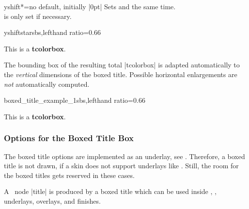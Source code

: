 \begin{boxTcbKey}{yshift*}{=}{no default, initially |0pt|}
Sets  and 
the same time.\\
 is only set if necessary.
\begin{exdispExample*}{yshiftstar}{sbs,lefthand ratio=0.66}
\begin{tcolorbox}[enhanced,title=My title,
  attach boxed title to top center={yshift*=-3mm},
  boxed title style={size=small,colback=blue}]
  This is a \textbf{tcolorbox}.
\end{tcolorbox}
\end{exdispExample*}
\end{boxTcbKey}

\begin{marker}
The bounding box of the resulting total |tcolorbox| is adapted automatically to the
\emph{vertical} dimensions of the boxed title. Possible horizontal enlargements
are \emph{not} automatically computed.
\end{marker}


\begin{exdispExample*}{boxed_title_example_1}{sbs,lefthand ratio=0.66}
\begin{tcolorbox}[enhanced,title=My title,
  attach boxed title to top left=
    {xshift=-2mm,yshift=-2mm},
  boxed title style={size=small,colback=blue},
  show bounding box]
  This is a \textbf{tcolorbox}.
\end{tcolorbox}
\end{exdispExample*}


\clearpage
\subsubsection{Options for the Boxed Title Box}
\begin{marker}
  The boxed title options are implemented as an underlay, see .
  Therefore, a boxed title is not drawn, if a skin does not support underlays
  like . Still, the room for the boxed
  titles gets reserved in these cases.
\end{marker}

\begin{marker}
  A \tikzname\ node |title| is produced by a boxed title which can be used
  inside , ,
  underlays, overlays, and finishes.
\end{marker}

